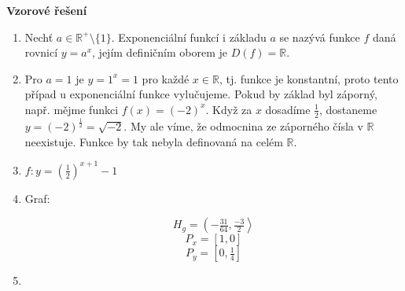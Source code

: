 \documentclass[12pt,a4paper,addpoints]{exam}
\begin{document}
    \begin{center}
      \Large\textbf{Vzorové řešení}\normalsize
      \begin{enumerate}
        \item Nechť $a \in \mathbb{R}^+ \setminus \{ 1 \}$. Exponenciální funkcí i základu $a$ se nazývá funkce $f$ daná rovnicí $y=a^x$,     jejím definičním oborem je $D(f) = \mathbb{R}$.

        \item Pro $a=1$ je $y=1^x = 1$ pro každé $x \in \mathbb{R}$, tj. funkce je konstantní, proto tento případ u exponenciální funkce vylučujeme.
        Pokud by základ byl záporný, např. mějme funkci $f(x) = (-2)^x$. Když za $x$ dosadíme $\tfrac{1}{2}$, dostaneme $y=(-2)^{\tfrac{1}{2}} = \sqrt{-2}$. My ale víme, že odmocnina ze záporného čísla v $\mathbb{R}$ neexistuje. Funkce by tak nebyla definovaná na celém $\mathbb{R}$.

        \item $f: y=\left(\tfrac{1}{2}\right)^{x+1}-1$
        \item Graf:\\
        \begin{center}
        \end{center}

        $$H_g = \left(-\tfrac{31}{64},\tfrac{-3}{2}\right\rangle$$
        $$P_x = \left[1,0\right]$$
        $$P_y = \left[0,\tfrac{1}{4}\right]$$
        \item  {}
      \end{enumerate}

    \end{center}
\end{document}

